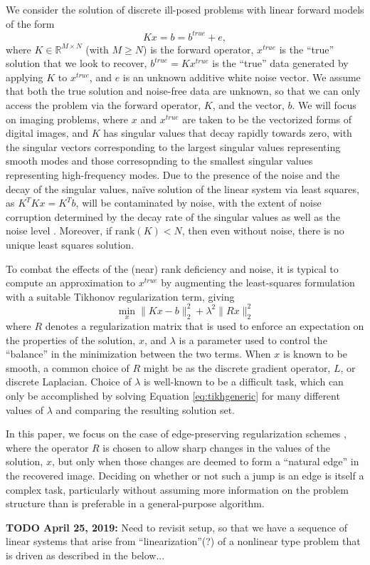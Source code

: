 We consider the solution of discrete ill-posed problems with linear
forward models of the form
\begin{equation}
\label{eq:exact}
K x = b = b^{true} + e,
\end{equation}
where $K \in \mathbb{R}^{M\times N}$ (with $M \geq N$) is the forward
operator, $x^{true}$ is the ``true'' solution that we look to recover,
$b^{true} = Kx^{true}$ is the ``true'' data generated by applying $K$
to $x^{true}$, and $e$ is an unknown additive white noise vector.  We
assume that both the true solution and noise-free data are unknown, so
that we can only access the problem via the forward operator, $K$, and
the vector, $b$.  We will focus on imaging problems, where $x$ and
$x^{true}$ are taken to be the vectorized forms of digital images, and
$K$ has singular values that decay rapidly towards zero, with the
singular vectors corresponding to the largest singular values
representing smooth modes and those corresopnding to the smallest
singular values representing high-frequency modes.  Due to the
presence of the noise and the decay of the singular values, na\"ive
solution of the linear system via least squares, as $K^TK x = K^Tb$,
will be contaminated by noise, with the extent of noise corruption
determined by the decay rate of the singular values as well as the
noise level \cite{Hansenbk}.  Moreover, if $\text{rank}(K)< N$, then
even without noise, there is no unique least squares solution.

To combat the effects of the (near) rank deficiency and noise, it is typical to
compute an approximation to $x^{true}$ by augmenting the least-squares
formulation with a suitable
Tikhonov regularization \cite{Tikhonov} term, giving
\begin{equation}
\label{eq:tikhgeneric}
\min_{x} \| K x - b \|_2^2 + \lambda^2 \| R x \|_2^2
\end{equation}
where $R$ denotes a regularization matrix that is used to enforce an
expectation on the properties of the solution, $x$, and $\lambda$ is a
parameter used to control the ``balance'' in the minimization between
the two terms.  When $x$ is known to be smooth, a common choice of $R$
might be as the discrete gradient operator, $L$, or discrete
Laplacian.  Choice of $\lambda$ is well-known to be a difficult task,
which can only be accomplished by solving
Equation \eqref{eq:tikhgeneric} for many different values of $\lambda$
and comparing the resulting solution set.

In this paper, we focus on the case of edge-preserving regularization
schemes \cite{???}, where the operator $R$ is chosen to allow sharp
changes in the values of the solution, $x$, but only when those
changes are deemed to form a ``natural edge'' in the recovered image.
Deciding on whether or not such a jump is an edge is itself a complex
task, particularly without assuming more information on the problem
structure than is preferable in a general-purpose algorithm.  

{\bf TODO April 25, 2019:} Need to revisit setup, so that we have a
sequence of linear systems that arise from ``linearization''(?) of a
nonlinear type problem that is driven as described in the below...
